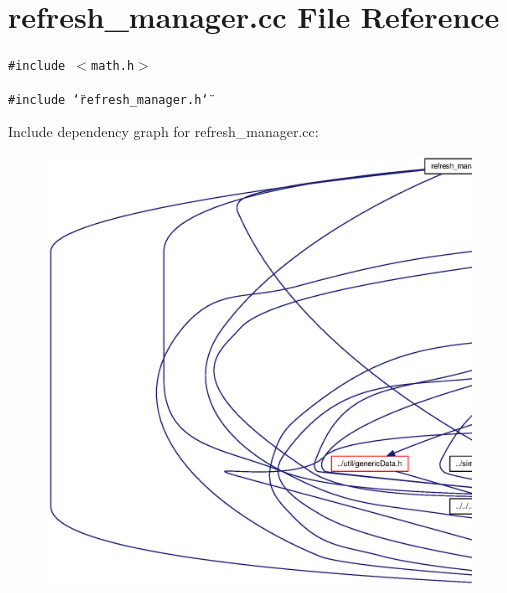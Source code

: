 \section{refresh\_\-manager.cc File Reference}
\label{refresh__manager_8cc}
{\tt \#include $<$math.h$>$}\par
{\tt \#include \char`\"{}refresh\_\-manager.h\char`\"{}}\par


Include dependency graph for refresh\_\-manager.cc:\nopagebreak
\begin{figure}[H]
\begin{center}
\leavevmode
\includegraphics[width=420pt]{refresh__manager_8cc__incl}
\end{center}
\end{figure}
